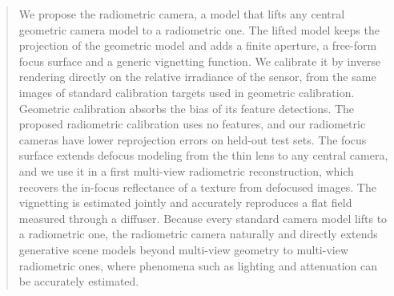 \begin{abstract}
	We propose the radiometric camera, a model that lifts any central
	geometric camera model to a radiometric one.  The lifted model
	keeps the projection of the geometric model and adds a finite
	aperture, a free-form focus surface and a generic vignetting
	function.  We calibrate it by inverse rendering directly on the
	relative irradiance of the sensor, from the same images of
	standard calibration targets used in geometric calibration.
	Geometric calibration absorbs the bias of its feature detections.
	The proposed radiometric calibration uses no features, and our
	radiometric cameras have lower reprojection errors on held-out
	test sets.  The focus surface extends defocus modeling from the
	thin lens to any central camera, and we use it in a first
	multi-view radiometric reconstruction, which recovers the in-focus
	reflectance of a texture from defocused images.  The
	vignetting is estimated jointly and accurately reproduces a flat
	field measured through a diffuser.  Because every standard camera
	model lifts to a radiometric one, the radiometric camera naturally
	and directly extends generative scene models beyond multi-view
	geometry to multi-view radiometric ones, where phenomena such as
	lighting and attenuation can be accurately estimated.
\end{abstract}
